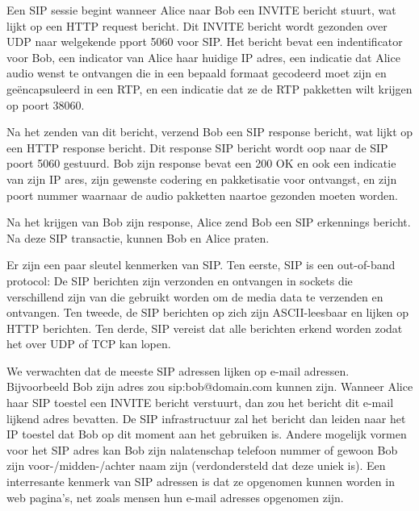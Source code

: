 \clearpage


Een SIP sessie begint wanneer Alice naar Bob een INVITE bericht stuurt, wat lijkt op een HTTP request bericht. Dit INVITE bericht wordt gezonden over UDP naar welgekende pport 5060 voor SIP. Het bericht bevat een indentificator voor Bob, een indicator van Alice haar huidige IP adres, een indicatie dat Alice audio wenst te ontvangen die in een bepaald formaat gecodeerd moet zijn en geëncapsuleerd in een RTP, en een indicatie dat ze de RTP pakketten wilt krijgen op poort 38060. 

Na het zenden van dit bericht, verzend Bob een SIP response bericht, wat lijkt op een HTTP response bericht. Dit response SIP bericht wordt oop naar de SIP poort 5060 gestuurd. Bob zijn response bevat een 200 OK en ook een indicatie van zijn IP ares, zijn gewenste codering en pakketisatie voor ontvangst, en zijn poort nummer waarnaar de audio pakketten naartoe gezonden moeten worden.

Na het krijgen van Bob zijn response, Alice zend Bob een SIP erkennings bericht. Na deze SIP transactie, kunnen Bob en Alice praten.

Er zijn een paar sleutel kenmerken van SIP. Ten eerste, SIP is een out-of-band protocol: De SIP berichten zijn verzonden en ontvangen in sockets die verschillend zijn van die gebruikt worden om de media data te verzenden en ontvangen. Ten tweede, de SIP berichten op zich zijn ASCII-leesbaar en lijken op HTTP berichten. Ten derde, SIP vereist dat alle berichten erkend worden zodat het over UDP of TCP kan lopen.


We verwachten dat de meeste SIP adressen lijken op e-mail adressen. Bijvoorbeeld Bob zijn adres zou sip:bob@domain.com kunnen zijn. Wanneer Alice haar SIP toestel een INVITE bericht verstuurt, dan zou het bericht dit e-mail lijkend adres bevatten. De SIP infrastructuur zal het bericht dan leiden naar het IP toestel dat Bob op dit moment aan het gebruiken is. Andere mogelijk vormen voor het SIP adres kan Bob zijn nalatenschap telefoon nummer of gewoon Bob zijn voor-/midden-/achter naam zijn (verdondersteld dat deze uniek is).
Een interresante kenmerk van SIP adressen is dat ze opgenomen kunnen worden in web pagina’s, net zoals mensen hun e-mail adresses opgenomen zijn.

\clearpage


